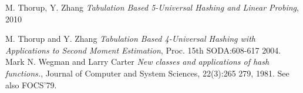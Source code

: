 \documentclass[11pt]{article}
\begin{document}

\begin{thebibliography}{77}

M. Thorup, Y. Zhang
\emph{Tabulation Based 5-Universal Hashing and Linear Probing},
2010

M. Thorup and Y. Zhang 
\emph{Tabulation Based 4-Universal Hashing with Applications to Second Moment Estimation},
Proc. 15th SODA:608-617 2004.
Mark N. Wegman and Larry Carter
\emph{New classes and applications of hash functions.},
Journal of Computer and System Sciences, 22(3):265 279, 1981. See also FOCS'79.
\end{thebibliography}


\end{document}
